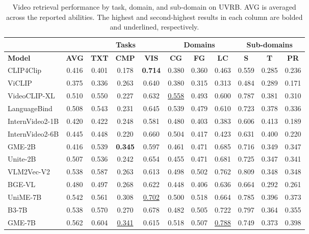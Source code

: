 \begin{table}[t]
\centering
\footnotesize
\caption{Video retrieval performance by task, domain, and sub-domain on UVRB. AVG is averaged across the reported abilities. The highest and second-highest results in each column are bolded and underlined, respectively.}
\label{gve:tab:main_by_abilities}
\setlength{\tabcolsep}{2pt}
\begin{tabularx}{\linewidth}{X|>{\columncolor{gray!40}}c|ccc|ccc|ccc}
\toprule
& & \multicolumn{3}{c|}{\textbf{Tasks}} & \multicolumn{3}{c|}{\textbf{Domains}} & \multicolumn{3}{c}{\textbf{Sub-domains}} \\
\midrule
\textbf{Model} & \textbf{AVG} & \textbf{TXT} & \textbf{CMP} & \textbf{VIS} & \textbf{CG} & \textbf{FG} & \textbf{LC} & \textbf{S} & \textbf{T} & \textbf{PR} \\
\midrule
CLIP4Clip        & 0.416 & 0.401 & 0.178 & \textbf{0.714} & 0.380 & 0.360 & 0.463 & 0.559 & 0.285 & 0.236 \\
ViCLIP           & 0.375 & 0.336 & 0.263 & 0.640 & 0.380 & 0.315 & 0.313 & 0.484 & 0.289 & 0.171 \\
VideoCLIP-XL     & 0.510 & 0.550 & 0.227 & 0.632 & \underline{0.558} & 0.493 & 0.600 & 0.787 & 0.381 & 0.310 \\
LanguageBind     & 0.508 & 0.543 & 0.231 & 0.645 & 0.539 & 0.479 & 0.610 & 0.723 & 0.378 & 0.336 \\
InternVideo2-1B  & 0.420 & 0.422 & 0.248 & 0.581 & 0.480 & 0.403 & 0.383 & 0.606 & 0.413 & 0.189 \\
InternVideo2-6B  & 0.445 & 0.448 & 0.220 & 0.660 & 0.504 & 0.417 & 0.423 & 0.631 & 0.400 & 0.220 \\
GME-2B           & 0.416 & 0.539 & \textbf{0.345} & 0.597 & 0.461 & 0.471 & 0.685 & 0.716 & 0.349 & 0.347 \\
Unite-2B         & 0.507 & 0.536 & 0.242 & 0.654 & 0.455 & 0.471 & 0.681 & 0.725 & 0.347 & 0.341 \\
VLM2Vec-V2       & 0.538 & 0.587 & 0.263 & 0.613 & 0.498 & 0.502 & 0.762 & 0.809 & 0.348 & 0.348 \\
BGE-VL           & 0.480 & 0.497 & 0.268 & 0.622 & 0.448 & 0.406 & 0.636 & 0.664 & 0.292 & 0.261 \\
UniME-7B         & 0.542 & 0.561 & 0.308 & \underline{0.702} & 0.500 & 0.518 & 0.664 & 0.785 & 0.396 & 0.373 \\
B3-7B            & 0.538 & 0.570 & 0.270 & 0.678 & 0.482 & 0.505 & 0.722 & 0.797 & 0.364 & 0.355 \\
GME-7B           & 0.562 & 0.604 & \underline{0.341} & 0.615 & 0.518 & 0.507 & \underline{0.788} & 0.749 & 0.373 & 0.398 \\

\end{tabularx}
\end{table}
